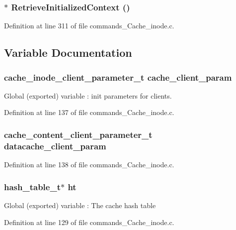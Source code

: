\subsubsection[{RetrieveInitializedContext}]{$\ast$ RetrieveInitializedContext ()}\label{commands__Cache__inode_8c_a2457d5b0e1f7d111a68951ab4d65638}




Definition at line 311 of file commands\_\-Cache\_\-inode.c.

\subsection{Variable Documentation}
\subsubsection[{cache\_\-client\_\-param}]{\setlength{\rightskip}{0pt plus 5cm}cache\_\-inode\_\-client\_\-parameter\_\-t {\bf cache\_\-client\_\-param}}\label{commands__Cache__inode_8c_c4a598ccee46876cdc0985f55efe423e}


Global (exported) variable : init parameters for clients. 

Definition at line 137 of file commands\_\-Cache\_\-inode.c.
\subsubsection[{datacache\_\-client\_\-param}]{\setlength{\rightskip}{0pt plus 5cm}cache\_\-content\_\-client\_\-parameter\_\-t {\bf datacache\_\-client\_\-param}}\label{commands__Cache__inode_8c_ba08423105348649c3c814a48c699f4f}




Definition at line 138 of file commands\_\-Cache\_\-inode.c.
\subsubsection[{ht}]{\setlength{\rightskip}{0pt plus 5cm}hash\_\-table\_\-t$\ast$ {\bf ht}}\label{commands__Cache__inode_8c_b1121adcdb706f580e1a8375f126c0f4}


Global (exported) variable : The cache hash table 

Definition at line 129 of file commands\_\-Cache\_\-inode.c.